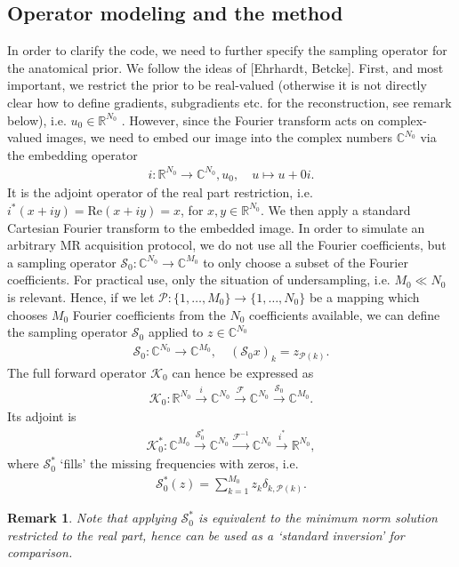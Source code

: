 \documentclass{article}
\newcommand{\C}{\mathbb{C}}
\newcommand{\R}{\mathbb{R}}
\newcommand{\Kcal}{\mathcal{K}}
\newcommand{\Fcal}{\mathcal{F}}
\newcommand{\Scal}{\mathcal{S}}
\newcommand{\Pcal}{\mathcal{P}}
\newcommand{\Real}{\mathrm{Re}}
\newtheorem{myrem}{Remark}
\begin{document}
\subsection{Operator modeling and the method}
In order to clarify the code, we need to further specify the sampling operator for the anatomical prior.
We follow the ideas of [Ehrhardt, Betcke].
First, and most important, we restrict the prior to be real-valued (otherwise it is not directly clear how to define gradients, subgradients etc. for the reconstruction, see remark below), i.e. $u_0 \in \R^{N_0}$ . 
However, since the Fourier transform acts on complex-valued images, we need to embed our image into the complex numbers $\C^{N_0}$ via the embedding operator 
\begin{align*}
 i \colon \R^{N_0} \to \C^{N_0}, u_0, \quad u\mapsto u + 0i.
\end{align*}
It is the adjoint operator of the real part restriction, i.e. $i^*(x + iy) = \Real(x + iy) = x$, for $x,y \in \R^{N_0}$. 
We then apply a standard Cartesian Fourier transform to the embedded image. 
In order to simulate an arbitrary MR acquisition protocol, we do not use all the Fourier coefficients, but a sampling operator $\Scal_0 \colon \C^{N_0} \to \C^{M_0}$ to only choose a subset of the Fourier coefficients. 
For practical use, only the situation of undersampling, i.e. ${M_0} \ll {N_0}$ is relevant. 
Hence, if we let $\Pcal \colon \{1,\dots,{M_0}\} \to \{1,\dots,{N_0}\}$ be a mapping which chooses ${M_0}$ Fourier coefficients from the $N_0$ coefficients available, we can define the sampling operator $\Scal_0$ applied to $z \in \C^{N_0}$ 
\begin{align*}
 \Scal_0 \colon \C^{N_0} \to \C^{M_0}, \quad (\Scal_0 x)_k = z_{\Pcal(k)}.
\end{align*}
The full forward operator $\Kcal_0$ can hence be expressed as 
\begin{align}
\label{eq:pr_forward_op}
 \Kcal_0 \colon \R^{N_0} \xrightarrow{i} \C^{N_0} \xrightarrow{\Fcal} \C^{N_0} \xrightarrow{\Scal_0} \C^{M_0}.
\end{align}
Its adjoint is 
\begin{align}
\label{eq:pr_adjoint_op}
 \Kcal_0^* \colon \C^{M_0} \xrightarrow{\Scal_0^*} \C^{N_0} \xrightarrow{\Fcal^{-1}} \C^{N_0} \xrightarrow{i^*} \R^{N_0},
\end{align}
where $\Scal_0^*$ `fills' the missing frequencies with zeros, i.e. 
\begin{align*}
 \Scal_0^*(z) = \sum_{k=1}^{M_0} z_k \delta_{k,\Pcal(k)}.
\end{align*}
%
\begin{myrem}
 Note that applying $\Scal_0^*$ is equivalent to the minimum norm solution restricted to the real part, hence can be used as a `standard inversion' for comparison.
\end{myrem}
\end{document}
